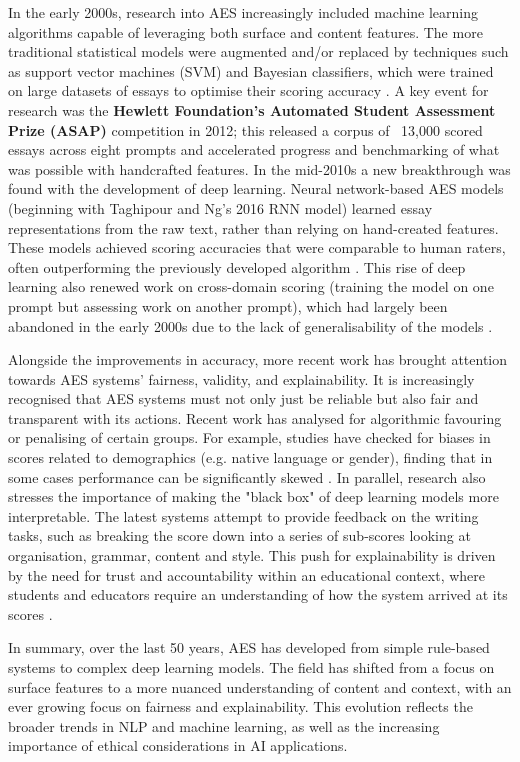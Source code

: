 \documentclass[8pt]{report}
\begin{document}
In the early 2000s, research into AES increasingly included machine learning algorithms capable of leveraging both surface and content features. The more traditional statistical models were augmented and/or replaced by techniques such as support vector machines (SVM) and Bayesian classifiers, which were trained on large datasets of essays to 
optimise their scoring accuracy \parencite{shermis2013handbook}. A key event for research was the \textbf{Hewlett Foundation’s Automated Student Assessment Prize (ASAP)} competition in 2012; this released a corpus of ~13,000 scored essays across eight prompts and accelerated progress and benchmarking of what was possible with handcrafted features. In 
the mid-2010s a new breakthrough was found with the development of deep learning. Neural network-based AES models (beginning with Taghipour and Ng's 2016 RNN model) learned essay representations from the raw text, rather than relying on hand-created features. These models achieved scoring accuracies that were comparable to human raters, often 
outperforming the previously developed algorithm \parencite{taghipour2016neural}. This rise of deep learning also renewed work on cross-domain scoring (training the model on one prompt but assessing work on another prompt), which had largely been abandoned in the early 2000s due to the lack of generalisability of the models \parencite{beigman2021narrative}.

Alongside the improvements in accuracy, more recent work has brought attention towards AES systems’ fairness, validity, and explainability. It is increasingly recognised that AES systems must not only just be reliable but also fair and transparent with its actions. Recent work has analysed for algorithmic favouring or penalising of certain 
groups. For example, studies have checked for biases in scores related to demographics (e.g. native language or gender), finding that in some cases performance can be significantly skewed \parencite{blodgett2020language}. In parallel, research also stresses the importance of making the "black box" of deep learning models more interpretable. The 
latest systems attempt to provide feedback on the writing tasks, such as breaking the score down into a series of sub-scores looking at organisation, grammar, content and style. This push for explainability is driven by the need for trust and accountability within an educational context, where students and educators require an understanding of how 
the system arrived at its scores \parencite{lundberg2017unified}.

In summary, over the last 50 years, AES has developed from simple rule-based systems to complex deep learning models. The field has shifted from a focus on surface features to a more nuanced understanding of content and context, with an ever growing focus on fairness and explainability. This evolution reflects the broader trends in NLP and machine 
learning, as well as the increasing importance of ethical considerations in AI applications.
\end{document}
